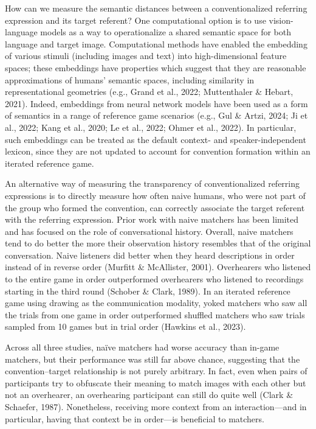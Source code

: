 \documentclass[10pt, letterpaper]{article}
\begin{document}
How can we measure the semantic distances between a conventionalized
referring expression and its target referent? One computational option
is to use vision-language models as a way to operationalize a shared
semantic space for both language and target image. Computational methods
have enabled the embedding of various stimuli (including images and
text) into high-dimensional feature spaces; these embeddings have
properties which suggest that they are reasonable approximations of
humans' semantic spaces, including similarity in representational
geometries (e.g., Grand et al., 2022; Muttenthaler \& Hebart, 2021).
Indeed, embeddings from neural network models have been used as a form
of semantics in a range of reference game scenarios (e.g., Gul \& Artzi,
2024; Ji et al., 2022; Kang et al., 2020; Le et al., 2022; Ohmer et al.,
2022). In particular, such embeddings can be treated as the default
context- and speaker-independent lexicon, since they are not updated to
account for convention formation within an iterated reference game.

An alternative way of measuring the transparency of conventionalized
referring expressions is to directly measure how often naive humans, who
were not part of the group who formed the convention, can correctly
associate the target referent with the referring expression. Prior work
with naive matchers has been limited and has focused on the role of
conversational history. Overall, naive matchers tend to do better the
more their observation history resembles that of the original
conversation. Naive listeners did better when they heard descriptions in
order instead of in reverse order (Murfitt \& McAllister, 2001).
Overhearers who listened to the entire game in order outperformed
overhearers who listened to recordings starting in the third round
(Schober \& Clark, 1989). In an iterated reference game using drawing as
the communication modality, yoked matchers who saw all the trials from
one game in order outperformed shuffled matchers who saw trials sampled
from 10 games but in trial order (Hawkins et al., 2023).

Across all three studies, naïve matchers had worse accuracy than in-game
matchers, but their performance was still far above chance, suggesting
that the convention--target relationship is not purely arbitrary. In
fact, even when pairs of participants try to obfuscate their meaning to
match images with each other but not an overhearer, an overhearing
participant can still do quite well (Clark \& Schaefer, 1987).
Nonetheless, receiving more context from an interaction---and in
particular, having that context be in order---is beneficial to matchers.
\end{document}
